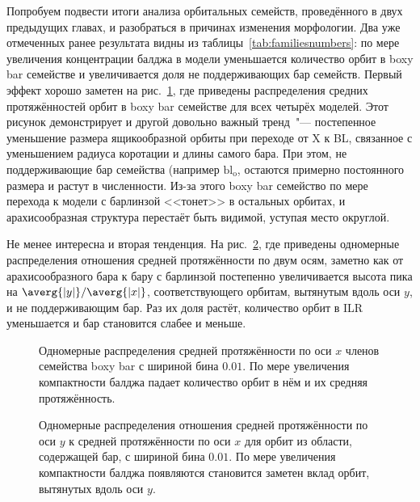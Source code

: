 \documentclass[tikz]{trlnotes}
\begin{document}
Попробуем подвести итоги анализа орбитальных семейств, проведённого в двух предыдущих главах,
и разобраться в причинах изменения морфологии.  Два уже отмеченных ранее результата видны из
таблицы~\ref{tab:familiesnumbers}: по мере увеличения концентрации балджа в модели уменьшается количество орбит в
boxy bar семействе и увеличивается доля не поддерживающих бар семейств.
Первый эффект хорошо заметен на рис.~\ref{fig:boxyamplcomp}, где приведены распределения средних протяжённостей орбит в boxy bar семействе для всех четырёх моделей. Этот рисунок демонстрирует и другой довольно важный тренд~"--- постепенное уменьшение размера ящикообразной орбиты при переходе от X к BL, связанное
с уменьшением радиуса коротации и длины самого бара. При этом, не поддерживающие бар семейства (например
$\text{bl}_{\text{o}}$, остаются примерно постоянного размера и растут в численности. Из-за этого boxy bar семейство
по мере перехода к модели с барлинзой <<тонет>> в остальных орбитах, и арахисообразная структура перестаёт быть
видимой, уступая место округлой.

Не менее интересна и вторая тенденция. На рис.~\ref{fig:axisratio}, где приведены одномерные распределения
отношения средней протяжённости по двум осям, заметно как от арахисообразного бара к бару с барлинзой 
постепенно увеличивается высота пика на $\averg{|y|}/\averg{|x|}$, соответствующего орбитам, вытянутым вдоль оси
$y$, и не поддерживающим бар. Раз их доля растёт, количество орбит в ILR уменьшается и бар становится слабее и
меньше. 

\begin{figure}[htpb]
  \centering
  \caption{Одномерные распределения средней протяжённости по оси $x$ членов семейства boxy bar с шириной бина $0.01$.
  По мере увеличения компактности балджа падает количество орбит в нём и их средняя протяжённость.}
  \label{fig:boxyamplcomp}
\end{figure}

\begin{figure}[htpb]
  \centering
  \caption{Одномерные распределения отношения средней протяжённости по оси $y$ к средней протяжённости по оси $x$ для орбит из
    области, содержащей бар, с шириной бина $0.01$. По мере увеличения компактности балджа появляются становится заметен вклад орбит,
    вытянутых вдоль оси $y$.}
  \label{fig:axisratio}
\end{figure}
\end{document}
